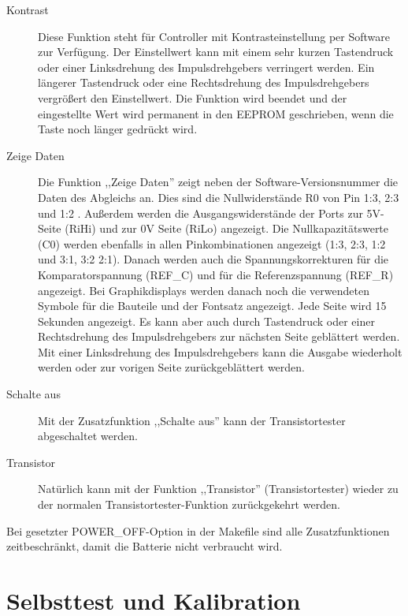 \begin{description}
\item[Kontrast] 
Diese Funktion steht für Controller mit Kontrasteinstellung per Software zur Verfügung.
Der Einstellwert kann mit einem sehr kurzen Tastendruck oder einer Linksdrehung des Impulsdrehgebers verringert werden.
Ein längerer Tastendruck oder eine Rechtsdrehung des Impulsdrehgebers vergrößert den Einstellwert.
Die Funktion wird beendet und der eingestellte Wert wird permanent in den EEPROM geschrieben, 
wenn die Taste noch länger gedrückt wird.

 \item[Zeige Daten]
Die Funktion ,,Zeige Daten'' zeigt neben der Software-Versionsnummer die Daten des Abgleichs an.
Dies sind die Nullwiderstände R0 von Pin 1:3, 2:3 und 1:2 .
Außerdem werden die Ausgangswiderstände der Ports zur 5V-Seite (RiHi) und 
zur 0V Seite (RiLo) angezeigt.
Die Nullkapazitätswerte (C0) werden ebenfalls in allen Pinkombinationen angezeigt (1:3, 2:3, 1:2 und 3:1, 3:2 2:1).
Danach werden auch die Spannungskorrekturen für die Komparatorspannung (REF\_C) und für die Referenzspannung (REF\_R) angezeigt.
Bei Graphikdisplays werden danach noch die verwendeten Symbole für die Bauteile und der Fontsatz angezeigt.
Jede Seite wird 15 Sekunden angezeigt.
Es kann aber auch durch Tastendruck oder einer Rechtsdrehung des Impulsdrehgebers
zur nächsten Seite geblättert werden.
Mit einer Linksdrehung des Impulsdrehgebers kann die Ausgabe wiederholt werden oder zur vorigen Seite zurückgeblättert werden.

 \item[Schalte aus]
Mit der Zusatzfunktion ,,Schalte aus'' kann der Transistortester abgeschaltet werden.\\

 \item[Transistor]
Natürlich kann mit der Funktion ,,Transistor'' (Transistortester) wieder zu der normalen Transistortester-Funktion
zurückgekehrt werden.

\end{description}

Bei gesetzter POWER\_OFF-Option in der Makefile sind alle Zusatzfunktionen zeitbeschränkt, damit die Batterie nicht verbraucht wird.

\section{Selbsttest und Kalibration}

